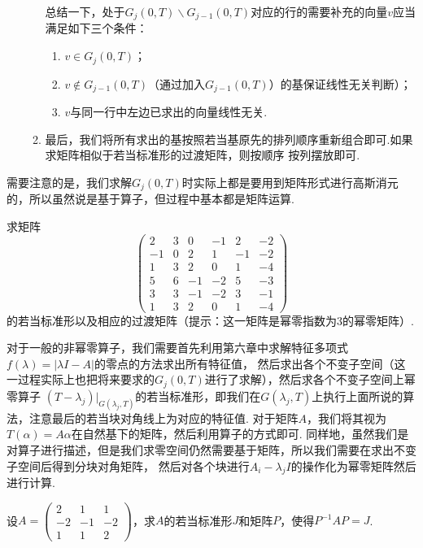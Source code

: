 \begin{enumerate}
\begin{enumerate}[label=(\arabic*)]
        总结一下，处于$G_j(0,T)\backslash G_{j-1}(0,T)$对应的行的需要补充的向量$v$应当满足如下三个条件：
        \begin{enumerate}[label=(\roman*)]
            \item $v\in G_j(0,T)$；

            \item $v\notin G_{j-1}(0,T)$（通过加入$G_{j-1}(0,T)$）的基保证线性无关判断）；

            \item $v$与同一行中左边已求出的向量线性无关.
        \end{enumerate}
        \item 最后，我们将所有求出的基按照若当基原先的排列顺序重新组合即可.如果求矩阵相似于若当标准形的过渡矩阵，则按顺序
        按列摆放即可.
    \end{enumerate}
\end{enumerate}
需要注意的是，我们求解$G_j(0,T)$时实际上都是要用到矩阵形式进行高斯消元的，所以虽然说是基于算子，但过程中基本都是矩阵运算.
\begin{example}
    求矩阵\[\begin{pmatrix}
        2 & 3 & 0 & -1 & 2 & -2 \\ -1 & 0 & 2 & 1 & -1 & -2 \\
        1 & 3 & 2 & 0  & 1 & -4 \\ 5 & 6 & -1 & -2 & 5 & -3 \\
        3 & 3 & -1 & -2 & 3 & -1 \\ 1 & 3 & 2 & 0 & 1 & -4
    \end{pmatrix}\]的若当标准形以及相应的过渡矩阵（提示：这一矩阵是幂零指数为3的幂零矩阵）.
\end{example}
对于一般的非幂零算子，我们需要首先利用第六章中求解特征多项式$f(\lambda)=|\lambda I-A|$的零点的方法求出所有特征值，
然后求出各个不变子空间（这一过程实际上也把将来要求的$G_j(0,T)$进行了求解），然后求各个不变子空间上幂零算子
$(T-\lambda_j)\vert_{G(\lambda_j,T)}$的若当标准形，即我们在$G(\lambda_j,T)$上执行上面所说的算法，注意最后的若当块对角线上为对应的特征值.
对于矩阵$A$，我们将其视为$T(\alpha)=A\alpha$在自然基下的矩阵，然后利用算子的方式即可.
同样地，虽然我们是对算子进行描述，但是我们求零空间仍然需要基于矩阵，所以我们需要在求出不变子空间后得到分块对角矩阵，
然后对各个块进行$A_i-\lambda_jI$的操作化为幂零矩阵然后进行计算.
\begin{example}
    设$A=\begin{pmatrix}
        2 & 1 & 1 \\ -2 & -1 & -2 \\ 1 & 1 & 2
    \end{pmatrix}$，求$A$的若当标准形$J$和矩阵$P$，使得$P^{-1}AP=J$.
\end{example}

